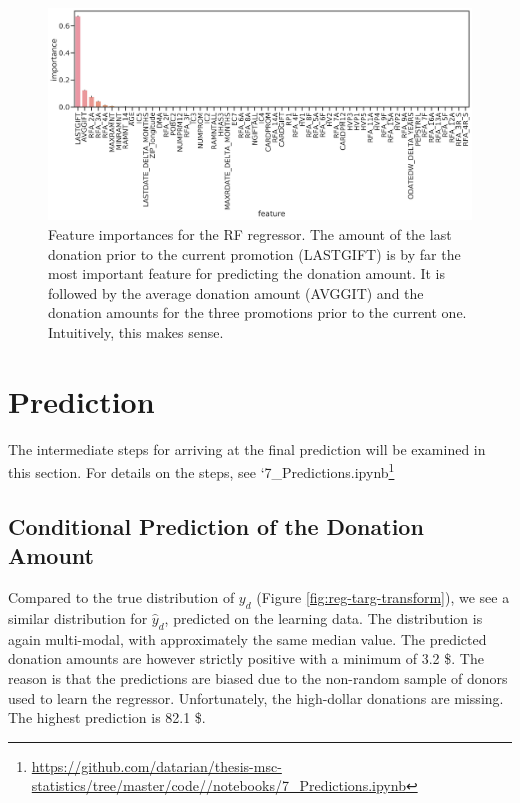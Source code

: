 \documentclass[
  11pt,
  a4paper,
  DIV=12,captions=tableheading,oneside,titlepage]{scrbook}
\begin{document}
\begin{figure}

{\centering \includegraphics[width=0.7\linewidth]{figures/learning/feature-importance-rf-regression} 

}

\caption{Feature importances for the RF regressor. The amount of the last donation prior to the current promotion (LASTGIFT) is by far the most important feature for predicting the donation amount. It is followed by the average donation amount (AVGGIT) and the donation amounts for the three promotions prior to the current one. Intuitively, this makes sense.}\label{fig:reg-importance}
\end{figure}

\hypertarget{prediction}{%
\section{Prediction}\label{prediction}}

The intermediate steps for arriving at the final prediction will be examined in this section. For details on the steps, see `7\_Predictions.ipynb\footnote{\url{https://github.com/datarian/thesis-msc-statistics/tree/master/code//notebooks/7_Predictions.ipynb}}

\hypertarget{conditional-prediction-of-the-donation-amount}{%
\subsection{Conditional Prediction of the Donation Amount}\label{conditional-prediction-of-the-donation-amount}}

Compared to the true distribution of \(y_d\) (Figure \ref{fig:reg-targ-transform}), we see a similar distribution for \(\hat{y}_d\), predicted on the learning data. The distribution is again multi-modal, with approximately the same median value. The predicted donation amounts are however strictly positive with a minimum of 3.2 \$. The reason is that the predictions are biased due to the non-random sample of donors used to learn the regressor. Unfortunately, the high-dollar donations are missing. The highest prediction is 82.1 \$.
\end{document}
